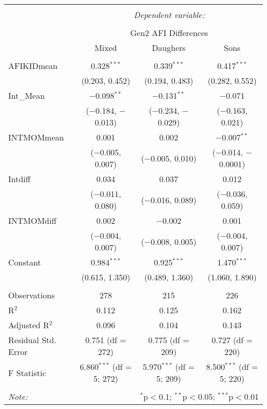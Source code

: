 
\begingroup 
\small 
\begin{tabular}{@{\extracolsep{1pt}}lccc} 
\\[-1.8ex]\hline 
\hline \\[-1.8ex] 
 & \multicolumn{3}{c}{\textit{Dependent variable:}} \\ 
\cline{2-4} 
\\[-1.8ex] & \multicolumn{3}{c}{Gen2 AFI Differences} \\ 
 & Mixed & Daughers & Sons \\ 
\hline \\[-1.8ex] 
 AFIKIDmean & 0.328$^{***}$ & 0.339$^{***}$ & 0.417$^{***}$ \\ 
  & (0.203, 0.452) & (0.194, 0.483) & (0.282, 0.552) \\ 
  Int\_Mean & $-$0.098$^{**}$ & $-$0.131$^{**}$ & $-$0.071 \\ 
  & ($-$0.184, $-$0.013) & ($-$0.234, $-$0.029) & ($-$0.163, 0.021) \\ 
  INTMOMmean & 0.001 & 0.002 & $-$0.007$^{**}$ \\ 
  & ($-$0.005, 0.007) & ($-$0.005, 0.010) & ($-$0.014, $-$0.0001) \\ 
  Intdiff & 0.034 & 0.037 & 0.012 \\ 
  & ($-$0.011, 0.080) & ($-$0.016, 0.089) & ($-$0.036, 0.059) \\ 
  INTMOMdiff & 0.002 & $-$0.002 & 0.001 \\ 
  & ($-$0.004, 0.007) & ($-$0.008, 0.005) & ($-$0.004, 0.007) \\ 
  Constant & 0.984$^{***}$ & 0.925$^{***}$ & 1.470$^{***}$ \\ 
  & (0.615, 1.350) & (0.489, 1.360) & (1.060, 1.890) \\ 
 \hline \\[-1.8ex] 
Observations & 278 & 215 & 226 \\ 
R$^{2}$ & 0.112 & 0.125 & 0.162 \\ 
Adjusted R$^{2}$ & 0.096 & 0.104 & 0.143 \\ 
Residual Std. Error & 0.751 (df = 272) & 0.775 (df = 209) & 0.727 (df = 220) \\ 
F Statistic & 6.860$^{***}$ (df = 5; 272) & 5.970$^{***}$ (df = 5; 209) & 8.500$^{***}$ (df = 5; 220) \\ 
\hline 
\hline \\[-1.8ex] 
\textit{Note:}  & \multicolumn{3}{r}{$^{*}$p$<$0.1; $^{**}$p$<$0.05; $^{***}$p$<$0.01} \\ 
\end{tabular} 
\endgroup 
